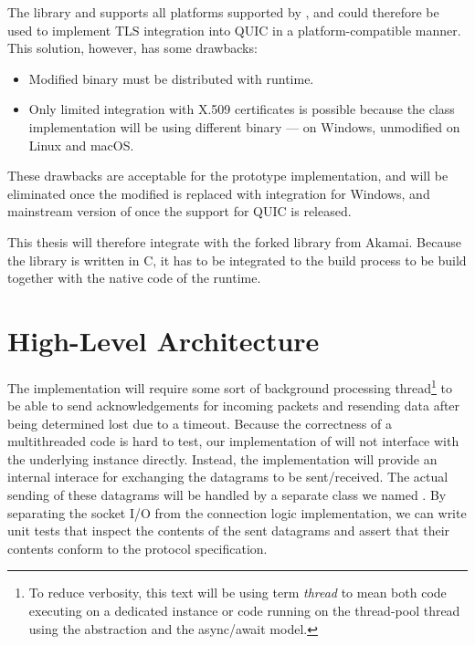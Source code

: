 The \libopenssl{} library and supports all platforms supported by \dotnet{}, and could therefore be
used to implement TLS integration into QUIC in a platform-compatible manner. This solution, however,
has some drawbacks:

\begin{itemize}

  \item Modified \libopenssl{} binary must be distributed with \dotnet{} runtime.

  \item Only limited integration with X.509 certificates is possible because the
     class implementation will be using different binary ---
     on Windows, unmodified \libopenssl{} on Linux and macOS.

\end{itemize}

These drawbacks are acceptable for the prototype implementation, and will be eliminated once the
modified \libopenssl{} is replaced with \libschannel{} integration for Windows, and mainstream
version of \libopenssl{} once the support for QUIC is released.

This thesis will therefore integrate with the forked \libopenssl{} library from Akamai. Because the
library is written in C, it has to be integrated to the build process to be build together with the
native code of the \dotnet{} runtime.

\section{High-Level Architecture}


The \QuicConnection{} implementation will require some sort of background processing
thread\footnote{To reduce verbosity, this text will be using term \textit{thread} to mean both code
  executing on a dedicated  instance or code running on the thread-pool thread using
  the  abstraction and the \dotnet{} async/await model.} to be able to send
acknowledgements for incoming packets and resending data after being determined lost due to a
timeout. Because the correctness of a multithreaded code is hard to test, our implementation of
\QuicConnection{} will not interface with the underlying \Socket{} instance directly. Instead,
the implementation will provide an internal interace for exchanging the datagrams to be
sent/received. The actual sending of these datagrams will be handled by a separate class we named
\QuicSocketContext{}. By separating the socket I/O from the connection logic implementation, we can
write unit tests that inspect the contents of the sent datagrams and assert that their contents
conform to the protocol specification.

